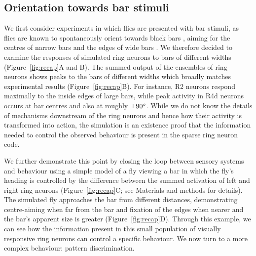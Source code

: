 \subsection*{Orientation towards bar stimuli}
We first consider experiments in which flies are presented with bar stimuli, as flies are known to spontaneously orient towards black bars \cite{Gotz1987}, aiming for the centres of narrow bars and the edges of wide bars \cite{Osorio1990}. We therefore decided to examine the responses of simulated ring neurons to bars of different widths (Figure~\ref{fig:recap}A and B). The summed output of the ensembles of ring neurons shows peaks to the bars of different widths which broadly matches experimental results (Figure~\ref{fig:recap}B). For instance, R2 neurons respond maximally to the inside edges of large bars, while peak activity in R4d neurons occurs at bar centres and also at roughly $\pm 90\degree$. While we do not know the details of mechanisms downstream of the ring neurons and hence how their activity is transformed into action, the simulation is an existence proof that the information needed to control the observed behaviour is present in the sparse ring neuron code.

We further demonstrate this point by closing the loop between sensory systems and behaviour using a simple model of a fly viewing a bar in which the fly’s heading is controlled by the difference between the summed activation of left and right ring neurons (Figure~\ref{fig:recap}C; see Materials and methods for details). The simulated fly approaches the bar from different distances, demonstrating centre-aiming when far from the bar and fixation of the edges when nearer and the bar’s apparent size is greater (Figure~\ref{fig:recap}D). Through this example, we can see how the information present in this small population of visually responsive ring neurons can control a specific behaviour. We now turn to a more complex behaviour: pattern discrimination. 

